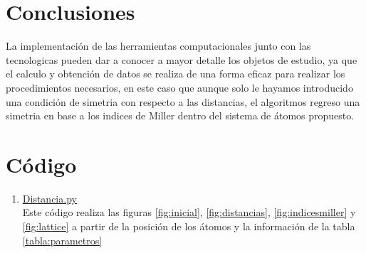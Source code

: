 \documentclass[reprint,amsmath,amssymb,aps,]{revtex4-2}
\begin{document}
\section{Conclusiones}
La implementación de las herramientas computacionales junto con las tecnologicas pueden dar a conocer a mayor detalle los objetos de estudio, 
ya que el calculo y obtención de datos se realiza de una forma eficaz para realizar los procedimientos necesarios, en este caso que aunque solo le hayamos
introducido una condición de simetria con respecto a las distancias, el algoritmos regreso una simetria en base a los indices de Miller dentro del sistema de átomos
propuesto.
\section{Código}
\begin{enumerate}
    \item \href{https://github.com/giovannilopez9808/Notas_Agosto_2020/blob/master/AMC/Tarea2/distancia.py}{Distancia.py\label{cod:distancias}}\\
    Este código realiza las figuras \ref{fig:inicial}, \ref{fig:distancias}, \ref{fig:indicesmiller} y \ref{fig:lattice} a partir de la posición de los átomos y la información de la tabla \ref{tabla:parametros}
\end{enumerate}

\nocite{*}

\end{document}
